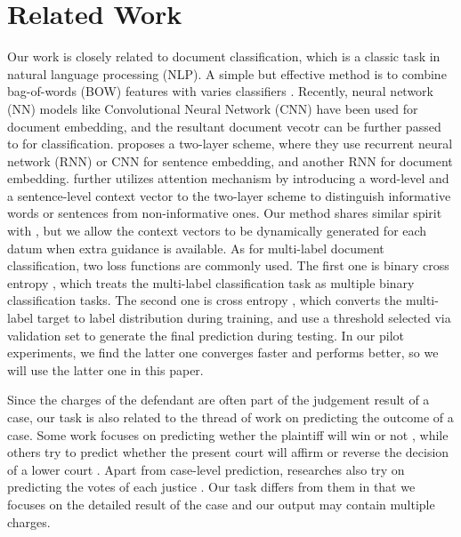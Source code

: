 \section{Related Work}
\label{sec_related_work}
Our work is closely related to document classification, which is a classic task in natural language processing (NLP). A simple but effective method is to combine bag-of-words (BOW) features with varies classifiers \cite{joachims1998text}. 
Recently, neural network (NN) models like Convolutional Neural Network (CNN) \cite{kim2014convolutional} have been used for document embedding, and the resultant document vecotr can be further passed to  for classification.
\cite{tang2015document} proposes a two-layer scheme, where they use recurrent neural network (RNN) or CNN for sentence embedding, and another RNN for document embedding. 
\cite{yang2016hierarchical} further utilizes attention mechanism by introducing a word-level and a sentence-level context vector to the two-layer scheme to distinguish informative words or sentences from non-informative ones. 
Our method shares similar spirit with \cite{yang2016hierarchical}, but we allow the context vectors to be dynamically generated for each datum when extra guidance is available. 
As for multi-label document classification, two loss functions are commonly used. 
The first one is binary cross entropy \cite{nam2014large}, which treats the multi-label classification task as multiple binary classification tasks. 
The second one is cross entropy \cite{kurata2016improved}, which converts the multi-label target to label distribution during training, and use a threshold selected via validation set to generate the final prediction during testing. In our pilot experiments, we find the latter one converges faster and performs better, so we will use the latter one in this paper.

Since the charges of the defendant are often part of the judgement result of a case, our task is also related to the thread of work on predicting the outcome of a case. Some work focuses on predicting wether the plaintiff will win or not \cite{bench1993neural,bruninghaus2003predicting,aletras2016predicting}, while others try to predict whether the present court will affirm or reverse the decision of a lower court \cite{martin2004competing,katz2016general}. Apart from case-level prediction, researches also try on predicting the votes of each justice \cite{martin2002dynamic,martin2004competing,lauderdale2014scaling,sim2015utility,katz2016general}. Our task differs from them in that we focuses on the detailed result of the case and our output may contain multiple charges.


